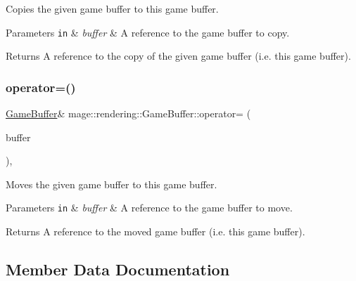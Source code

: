 Copies the given game buffer to this game buffer.


\begin{DoxyParams}[1]{Parameters}
\mbox{\tt in}  & {\em buffer} & A reference to the game buffer to copy. \\
\hline
\end{DoxyParams}
\begin{DoxyReturn}{Returns}
A reference to the copy of the given game buffer (i.\+e. this game buffer). 
\end{DoxyReturn}
\hypertarget{structmage_1_1rendering_1_1_game_buffer_a3fec557a6d2f02eaf2082caa59b5e310}{}\label{structmage_1_1rendering_1_1_game_buffer_a3fec557a6d2f02eaf2082caa59b5e310} 
\subsubsection{\texorpdfstring{operator=()}{operator=()}\hspace{0.1cm}{\footnotesize\ttfamily [2/2]}}
{\footnotesize\ttfamily \hyperlink{structmage_1_1rendering_1_1_game_buffer}{Game\+Buffer}\& mage\+::rendering\+::\+Game\+Buffer\+::operator= (\begin{DoxyParamCaption}\item[{\hyperlink{structmage_1_1rendering_1_1_game_buffer}{Game\+Buffer} \&\&}]{buffer }\end{DoxyParamCaption})\hspace{0.3cm}{\ttfamily [default]}, {\ttfamily [noexcept]}}

Moves the given game buffer to this game buffer.


\begin{DoxyParams}[1]{Parameters}
\mbox{\tt in}  & {\em buffer} & A reference to the game buffer to move. \\
\hline
\end{DoxyParams}
\begin{DoxyReturn}{Returns}
A reference to the moved game buffer (i.\+e. this game buffer). 
\end{DoxyReturn}


\subsection{Member Data Documentation}
\hypertarget{structmage_1_1rendering_1_1_game_buffer_a046916a46d80f979ac4f16c2ba58d8ef}{}\label{structmage_1_1rendering_1_1_game_buffer_a046916a46d80f979ac4f16c2ba58d8ef} 
